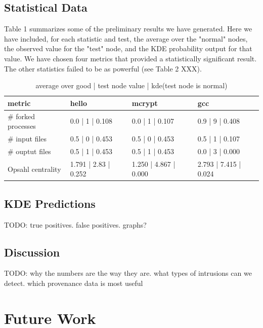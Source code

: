 \documentclass[10pt,twocolumn]{article}
\begin{document}
\subsection{Statistical Data}
Table 1 summarizes some of the preliminary results we have generated. Here we have included, for each statistic and test, the average over the "normal" nodes, the observed value for the "test" node, and the KDE probability output for that value. We have chosen four metrics that provided a statistically significant result. The other statistics failed to be as powerful (see Table 2 XXX).
\begin{center}
\begin{table}[ht]
{\small
  \begin{tabular}{| l | l | l | l |}
    \hline
    metric & hello & mcrypt & gcc \\ \hline
     \# forked processes & 0.0 | 1 | 0.108 & 0.0 | 1 | 0.107 & 0.9 | 9 | 0.408 \\ \hline
     \# input files & 0.5 | 0 | 0.453 & 0.5 | 0 | 0.453 & 0.5 | 1 | 0.107 \\ \hline
     \# ouptut files & 0.5 | 1 | 0.453 & 0.5 | 1 | 0.453 & 0.0 | 3 | 0.000 \\ \hline
    Opsahl centrality & 1.791 | 2.83 | 0.252 & 1.250 | 4.867 | 0.000 & 2.793 | 7.415 | 0.024 \\
    \hline
  \end{tabular}
}
\hfill{}
\caption{average over good | test node value | kde(test node is normal)
}
\label{tb:tablename}
\end{table}
\end{center}
\subsection{KDE Predictions}
TODO:
true positives.
false positives.
graphs?

\subsection{Discussion}
TODO: 
why the numbers are the way they are.
what types of intrusions can we detect.
which provenance data is most useful

%

\section{Future Work}
\end{document}
